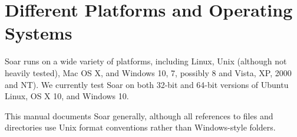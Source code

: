 \section{Different Platforms and Operating Systems}
\label{INTRO-platforms}

Soar runs on a wide variety of platforms, including Linux, Unix
(although not heavily tested), Mac OS X, and Windows 10, 7, possibly 8 and Vista, XP, 2000 and NT). We currently test Soar on both 32-bit and 64-bit versions of Ubuntu Linux, OS X 10, and Windows 10.

This manual documents Soar generally, although all references to files
and directories use Unix format conventions rather than Windows-style folders.

